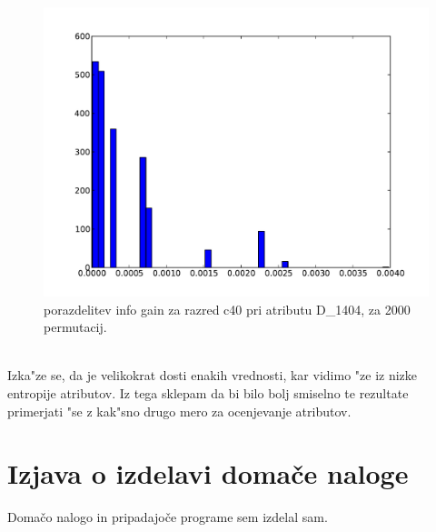 \documentclass[a4paper,11pt]{article}
\begin{document}
\begin{figure}[H]
\begin{center}
\includegraphics[scale=0.6]{testc40D_1404Orange.pdf}
\caption{porazdelitev info gain za razred c40 pri atributu D\_1404, za 2000 permutacij.}
\label{slika1}
\end{center}
\end{figure}\ \\[-40pt]

Izka"ze se, da je velikokrat dosti enakih vrednosti, kar vidimo "ze iz nizke entropije atributov. Iz tega sklepam da bi bilo bolj smiselno te rezultate primerjati "se z kak"sno drugo mero za ocenjevanje atributov.


\section{Izjava o izdelavi domače naloge}
Domačo nalogo in pripadajoče programe sem izdelal sam.
\end{document}
